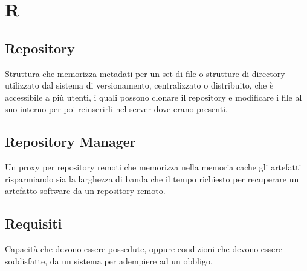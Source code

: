 \section*{R}

\subsection{Repository}
Struttura che memorizza metadati per un set di file o strutture di directory utilizzato dal sistema di versionamento, centralizzato o distribuito, che è accessibile a più utenti, i quali possono clonare il repository e modificare i file al suo interno per poi reinserirli nel server dove erano presenti.

\subsection{Repository Manager}
Un proxy per repository remoti che memorizza nella memoria cache gli artefatti risparmiando sia la larghezza di banda che il tempo richiesto per recuperare un artefatto software da un repository remoto.

\subsection{Requisiti}
Capacità che devono essere possedute, oppure condizioni che devono essere soddisfatte, da un sistema per adempiere ad un obbligo.